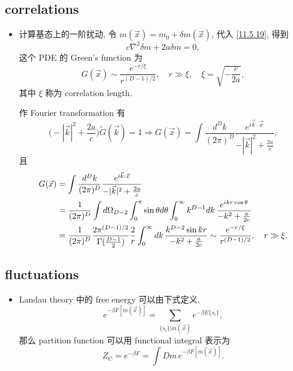\subsection{correlations}
\begin{itemize}
	\item 计算基态上的一阶扰动, 令 $m(\vec{x}) = m_0 + \delta m(\vec{x})$, 代入 \eqref{11.5.19}, 得到
	\begin{equation}
		c \nabla^2 \delta m + 2 a \delta m = 0,
	\end{equation}
	这个 PDE 的 Green's function 为
	\begin{equation}
		G(\vec{x}) \sim \frac{e^{- r / \xi}}{r^{(D - 1) / 2}}, \quad r \gg \xi, \quad \xi = \sqrt{- \frac{c}{2 a}},
	\end{equation}
	其中 $\xi$ 称为 correlation length.
	
	\begin{tcolorbox}[title=calculation:]
		作 Fourier transformation 有
		\begin{equation}
			\Big( - |\vec{k}|^2 + \frac{2 a}{c} \Big) \tilde{G}(\vec{k}) = 1 \Longrightarrow G(\vec{x}) = \int \frac{d^D k}{(2 \pi)^D} \frac{e^{i \vec{k} \cdot \vec{x}}}{- |\vec{k}|^2 + \frac{2 a}{c}},
		\end{equation}
		且
		\begin{align}
			G(\vec{x}) &= \int \frac{d^D k}{(2 \pi)^D} \frac{e^{i \vec{k} \cdot \vec{x}}}{- |\vec{k}|^2 + \frac{2 a}{c}} \notag \\
			&= \frac{1}{(2 \pi)^D} \int d\Omega_{D - 2} \int_0^\pi \sin \theta d\theta \int_0^\infty k^{D - 1} dk \, \frac{e^{i k r \cos \theta}}{- k^2 + \frac{a}{2 c}} \notag \\
			&= \frac{1}{(2 \pi)^D} \frac{2 \pi^{(D - 1) / 2}}{\Gamma(\frac{D - 1}{2})} \frac{2}{r} \int_0^\infty dk \, \frac{k^{D - 2} \sin k r}{- k^2 + \frac{a}{2 c}} \sim \frac{e^{- r / \xi}}{r^{(D - 1) / 2}}, \quad r \gg \xi.
		\end{align}
	\end{tcolorbox}
\end{itemize}

\subsection{fluctuations}
\begin{itemize}
	\item Landau theory 中的 free energy 可以由下式定义,
	\begin{equation}
		e^{- \beta F[m(\vec{x})]} = \sum_{\{s_i\} | m(\vec{x})} e^{- \beta E\{s_i\}},
	\end{equation}
	那么 partition function 可以用 functional integral 表示为
	\begin{equation}
		Z_\text{C} = e^{- \beta F} = \int Dm \, e^{- \beta F[m(\vec{x})]}.
	\end{equation}
\end{itemize}
